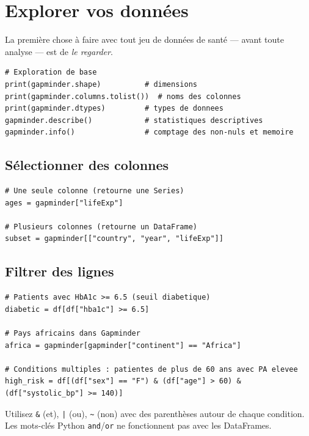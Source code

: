 \section{Explorer vos donn\'ees}

La premi\`ere chose \`a faire avec tout jeu de donn\'ees de sant\'e --- avant toute analyse --- est de \emph{le regarder}.

\begin{verbatim}
# Exploration de base
print(gapminder.shape)          # dimensions
print(gapminder.columns.tolist())  # noms des colonnes
print(gapminder.dtypes)         # types de donnees
gapminder.describe()            # statistiques descriptives
gapminder.info()                # comptage des non-nuls et memoire
\end{verbatim}

\subsection{S\'electionner des colonnes}

\begin{verbatim}
# Une seule colonne (retourne une Series)
ages = gapminder["lifeExp"]

# Plusieurs colonnes (retourne un DataFrame)
subset = gapminder[["country", "year", "lifeExp"]]
\end{verbatim}

\subsection{Filtrer des lignes}

\begin{verbatim}
# Patients avec HbA1c >= 6.5 (seuil diabetique)
diabetic = df[df["hba1c"] >= 6.5]

# Pays africains dans Gapminder
africa = gapminder[gapminder["continent"] == "Africa"]

# Conditions multiples : patientes de plus de 60 ans avec PA elevee
high_risk = df[(df["sex"] == "F") & (df["age"] > 60) & (df["systolic_bp"] >= 140)]
\end{verbatim}

\begin{warningbox}
Utilisez \texttt{\&} (et), \texttt{|} (ou), \texttt{\textasciitilde} (non) avec des parenth\`eses autour de chaque condition. Les mots-cl\'es Python \texttt{and}/\texttt{or} ne fonctionnent pas avec les DataFrames.
\end{warningbox}

